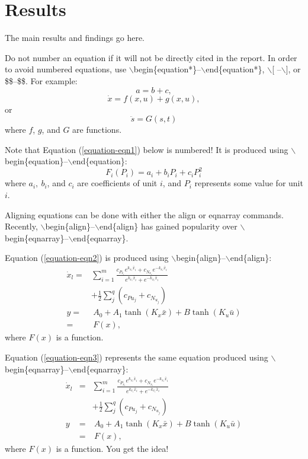 
\section{Results}
The main results and findings go here.

Do not number an equation if it will not be directly cited in the
report. In order to avoid numbered equations, use
$\backslash$begin\{equation*\}--$\backslash$end\{equation*\},
$\backslash$[ --$\backslash$], or \$\$--\$\$.  For example:
\begin{equation*}
a = b + c,
\end{equation*}
$$\dot x = f(x,u) + g(x,u),$$
or
\[\ddot s=G(s,t)\]
where $f$, $g$, and $G$ are functions.

Note that Equation (\ref{equation-eqn1}) below is numbered!  It is
produced using $\backslash$begin\{equation\}--$\backslash$end\{equation\}:
\begin{equation}
F_i(P_i)=a_{i}+b_{i}P_i+c_{i}P_{i}^2
\label{equation-eqn1}
\end{equation}
where $a_{i},\ b_{i}$, and $c_{i}$ are coefficients of unit $i$, and $P_i$
represents some value for unit $i$.

Aligning equations can be done with
either the align or eqnarray commands.  Recently,
$\backslash$begin\{align\}--$\backslash$end\{align\} has gained popularity
over $\backslash$begin\{eqnarray\}--$\backslash$end\{eqnarray\}.

Equation (\ref{equation-eqn2}) is produced using
$\backslash$begin\{align\}--$\backslash$end\{align\}:
\begin{align}
\dot {x}_l=& \sum_{i = 1}^m {\frac{c_{P_{x_i} } e^{k_{x_i}\bar{x}_i} + c_{N_{x_i} }
e^{ -  k_{x_i} \bar{x}_i}}{e^{k_{x_i} \bar{x}_i} + e^{ - k_{x_i} \bar{x}_i}}} \nonumber\\
& + \frac{1}{2}\sum\limits_j^q (c_{P{u_j }} + c_{N _{u_j }} ) \nonumber\\
y=& \ A_0 + A_1 \tanh (K_x \bar {x}) + B\tanh (K_u \bar {u}) \nonumber\\
 =& \ F(x),
\label{equation-eqn2}
\end{align}
where $F(x)$ is a function.

Equation (\ref{equation-eqn3}) represents the same equation produced
using $\backslash$begin\{eqnarray\}--$\backslash$end\{eqnarray\}:
\begin{eqnarray}
\dot {x}_l&=& \sum_{i = 1}^m {\frac{c_{P_{x_i} } e^{k_{x_i}\bar{x}_i} + c_{N_{x_i} }
e^{ - k_{x_i} \bar{x}_i}}{e^{k_{x_i} \bar{x}_i} + e^{ - k_{x_i} \bar{x}_i}}} \nonumber\\
&&+ \frac{1}{2}\sum\limits_j^q (c_{P{u_j }} + c_{N _{u_j }} ) \nonumber\\
y&=& \ A_0 + A_1 \tanh (K_x \bar {x}) + B\tanh (K_u \bar {u})\nonumber\\
&=& \ F(x),
\label{equation-eqn3}
\end{eqnarray}
where $F(x)$ is a function.  You get the idea!


